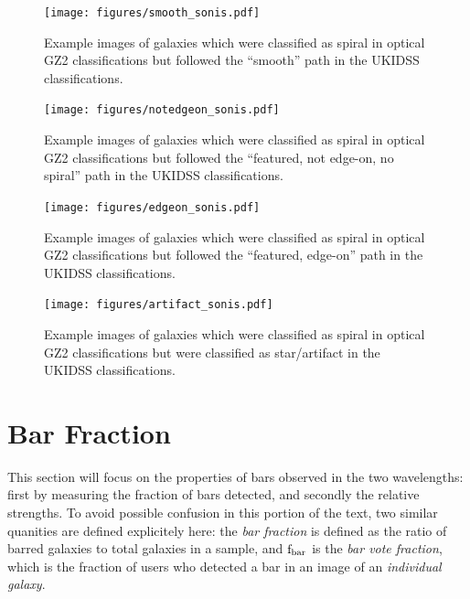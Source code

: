 \begin{figure}
\centering
\texttt{[image: figures/smooth\_sonis.pdf]}
\caption{Example images of galaxies which were classified as spiral in optical GZ2 classifications but followed the ``smooth'' path in the UKIDSS classifications.}
\label{fig:smooth}
\end{figure}

\begin{figure}
\centering
\texttt{[image: figures/notedgeon\_sonis.pdf]}
\caption{Example images of galaxies which were classified as spiral in optical GZ2 classifications but followed the ``featured, not edge-on, no spiral'' path in the UKIDSS classifications.}
\label{fig:notedgeon}
\end{figure}

 
\begin{figure}
\centering
\texttt{[image: figures/edgeon\_sonis.pdf]}
\caption{Example images of galaxies which were classified as spiral in optical GZ2 classifications but followed the ``featured, edge-on'' path in the UKIDSS classifications.}
\label{fig:edgeon}
\end{figure}

 
\begin{figure}
\centering
\texttt{[image: figures/artifact\_sonis.pdf]}
\caption{Example images of galaxies which were classified as spiral in optical GZ2 classifications but were classified as star/artifact in the UKIDSS classifications.}
\label{fig:artifact}
\end{figure}


\section{Bar Fraction}
This section will focus on the properties of bars observed in the two wavelengths: first by measuring the fraction of bars detected, and secondly the relative strengths. To avoid possible confusion in this portion of the text, two similar quanities are defined explicitely here: the \emph{bar fraction} is defined as the ratio of barred galaxies to total galaxies in a sample, and $\rm f_{bar}$ is the \emph{bar vote fraction}, which is the fraction of users who detected a bar in an image of an \emph{individual galaxy}.

